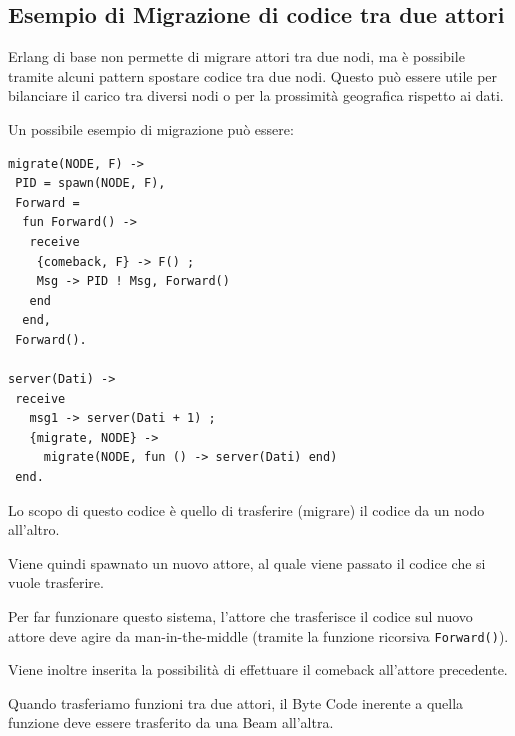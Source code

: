 \documentclass{article}
\begin{document}
\pagebreak

\subsection*{Esempio di Migrazione di codice tra due attori}
Erlang di base non permette di migrare attori tra due nodi, ma è possibile tramite alcuni pattern spostare codice tra due nodi. Questo può essere utile per bilanciare il carico tra diversi nodi o per la prossimità geografica rispetto ai dati.

Un possibile esempio di migrazione può essere:
\begin{tcolorbox}
\begin{verbatim}
migrate(NODE, F) ->
 PID = spawn(NODE, F),
 Forward =
  fun Forward() ->
   receive
    {comeback, F} -> F() ;
    Msg -> PID ! Msg, Forward()
   end
  end,
 Forward().

server(Dati) ->
 receive
   msg1 -> server(Dati + 1) ;
   {migrate, NODE} ->
     migrate(NODE, fun () -> server(Dati) end)
 end.
\end{verbatim}
\end{tcolorbox}
Lo scopo di questo codice è quello di trasferire (migrare) il codice da un nodo all'altro.

Viene quindi spawnato un nuovo attore, al quale viene passato il codice che si vuole trasferire.

Per far funzionare questo sistema, l'attore che trasferisce il codice sul nuovo attore deve agire da man-in-the-middle (tramite la funzione ricorsiva \texttt{Forward()}).

Viene inoltre inserita la possibilità di effettuare il comeback all'attore precedente.

Quando trasferiamo funzioni tra due attori, il Byte Code inerente a quella funzione deve essere trasferito da una Beam all'altra.
\end{document}
